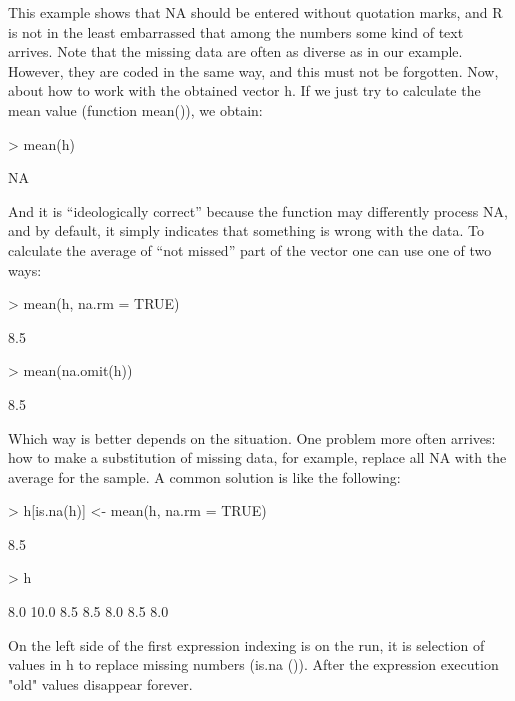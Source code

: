 \documentclass[a4paper,11pt]{scrartcl}
\begin{document}
This example shows that NA should be entered without quotation marks, and R is not in the least embarrassed that among the numbers some kind of text arrives. Note that the missing data are often as diverse as in our example. However, they are coded in the same way, and this must not be forgotten. Now, about how to work with the obtained vector h. If we just try to calculate the mean value (function mean()), we obtain:
\begin{Schunk}
\begin{Sinput}
> mean(h)
\end{Sinput}
\begin{Soutput}
[1] NA
\end{Soutput}
\end{Schunk}
And it is “ideologically correct” because the function may differently process NA, and by default, it simply indicates that something is wrong with the data. To calculate the average of “not missed” part of the vector one can use one of two ways:
\begin{Schunk}
\begin{Sinput}
> mean(h, na.rm = TRUE)
\end{Sinput}
\begin{Soutput}
[1] 8.5
\end{Soutput}
\begin{Sinput}
> mean(na.omit(h))
\end{Sinput}
\begin{Soutput}
[1] 8.5
\end{Soutput}
\end{Schunk}

Which way is better depends on the situation. One problem more often arrives: how to make a substitution of missing data, for example, replace all NA with the average for the sample. A common solution is like the following:

\begin{Schunk}
\begin{Sinput}
> h[is.na(h)] <- mean(h, na.rm = TRUE)
\end{Sinput}
\begin{Soutput}
[1] 8.5
\end{Soutput}
\begin{Sinput}
> h
\end{Sinput}
\begin{Soutput}
[1]  8.0 10.0  8.5  8.5  8.0  8.5  8.0
\end{Soutput}
\end{Schunk}
On the left side of the first expression indexing is on the run, it is selection of values in h to replace missing numbers (is.na ()). After the expression execution "old" values disappear forever.
\end{document}

